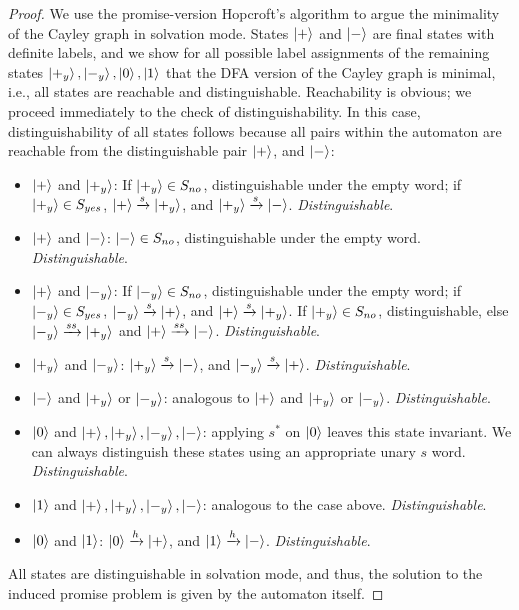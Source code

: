 \documentclass[../main.tex]{subfiles}
\begin{document}
\begin{proof}
    We use the promise-version Hopcroft's algorithm to argue the minimality of the Cayley graph in solvation mode. States $\ket{+}$ and $\ket{-}$ are final states with definite labels, and we show for all possible label assignments of the remaining states $\ket{+_y},\ket{-_y},\ket{0},\ket{1}$ that the DFA version of the Cayley graph is minimal, i.e., all states are reachable and distinguishable. Reachability is obvious; we proceed immediately to the check of distinguishability. In this case, distinguishability of all states follows because all pairs within the automaton are reachable from the distinguishable pair  $\ket{+}$, and $\ket{-}$: 
    \begin{itemize}
        \item $\ket{+}$ and $\ket{+_y}$: If $\ket{+_y} \in S_{no}$, distinguishable under the empty word; if $\ket{+_y} \in S_{yes}$, $\ket{+}\xrightarrow{s} \ket{+_y}$, and $\ket{+_y}\xrightarrow{s} \ket{-}$. \textit{Distinguishable}.
        
        \item $\ket{+}$ and $\ket{-}$: $\ket{-} \in S_{no}$, distinguishable under the empty word. \textit{Distinguishable}.
        
       \item $\ket{+}$ and $\ket{-_y}$: If $\ket{-_y} \in S_{no}$, distinguishable under the empty word; if $\ket{-_y} \in S_{yes}$, $\ket{-_y}\xrightarrow{s} \ket{+}$, and $\ket{+}\xrightarrow{s} \ket{+_y}$. If $\ket{+_y} \in S_{no}$, distinguishable, else $\ket{-_y}\xrightarrow{ss} \ket{+_y}$ and $\ket{+}\xrightarrow{ss} \ket{-}$. \textit{Distinguishable}.

        \item $\ket{+_y}$ and $\ket{-_y}$:  $\ket{+_y}\xrightarrow{s} \ket{-}$, and $\ket{-_y}\xrightarrow{s} \ket{+}$. \textit{Distinguishable}.

        \item $\ket{-}$ and $\ket{+_y}$ or $\ket{-_y}$: analogous to $\ket{+}$ and $\ket{+_y}$ or $\ket{-_y}$. \textit{Distinguishable}.

        \item $\ket{0}$ and $\ket{+}, \ket{+_y}, \ket{-_y}, \ket{-}$: applying $s^*$ on $\ket{0}$ leaves this state invariant. We can always distinguish these states using an appropriate unary $s$ word. \textit{Distinguishable}.

        \item $\ket{1}$ and $\ket{+}, \ket{+_y}, \ket{-_y}, \ket{-}$: analogous to the case above. \textit{Distinguishable}.

        \item $\ket{0}$ and $\ket{1}$: $\ket{0}\xrightarrow{h} \ket{+}$, and $\ket{1}\xrightarrow{h} \ket{-}$. \textit{Distinguishable}.
        
        \end{itemize}
        
        All states are distinguishable in solvation mode, and thus, the solution to the induced promise problem is given by the automaton itself.
\end{proof}
\end{document}
